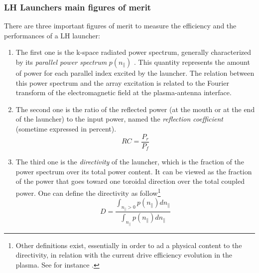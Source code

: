 %
%


\subsubsection{LH Launchers main figures of merit}

There are three important figures of merit to measure the efficiency and the performances of a LH launcher: 
\begin{enumerate}
	\item The first one is the k-space radiated power spectrum, generally characterized by its \emph{parallel power spectrum} $p(n_{\parallel})$ . This quantity represents the amount of power for each parallel index excited by the launcher. The relation between this power spectrum and the array excitation is related to the Fourier transform of the electromagnetic field at the plasma-antenna interface. 
	
	\item  The second one is the ratio of the reflected power (at the mouth or at the end of the launcher) to the input power, named the \emph{reflection coefficient} (sometime expressed in percent). 
	$$RC = \frac{P_r}{P_f}$$
	\item The third one is the \emph{directivity} of the launcher, which is the fraction of the power spectrum over its total power content. It can be viewed as the fraction of the power that goes toward one toroidal direction over the total coupled power. One can define the directivity as follow\footnote{Other definitions exist, essentially in order to ad a physical content to the directivity, in relation with the current drive efficiency evolution in the plasma. See for instance .}
	$$
	D
	= 
	\frac{
		\int_{n_{\parallel} >0} p(n_{\parallel}) dn_{\parallel} 
	}{
		\int_{n_{\parallel}} p(n_{\parallel}) dn_{\parallel} } 
	$$
\end{enumerate}


